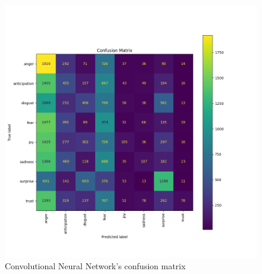 \begin{figure}[H]
    \centering
    \includegraphics[width=0.7\linewidth]{pictures/cnn_confusion_matrix.png}
    \caption{Convolutional Neural Network's confusion matrix}
    \label{fig:cnn_confmatr}
\end{figure}

